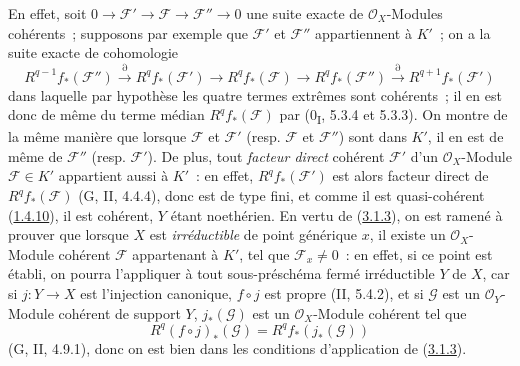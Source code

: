 En effet, soit
$0\to\mathcal F'\to\mathcal F\to\mathcal F''\to0$ une suite exacte de
$\mathcal O_X$-Modules cohérents~; supposons par exemple que $\mathcal F'$
et $\mathcal F''$ appartiennent à $K'$~; on a la suite exacte de cohomologie
\[
R^{q-1}f_*(\mathcal F'')\xrightarrow{\partial}R^qf_*(\mathcal F')
\longrightarrow R^qf_*(\mathcal F)\longrightarrow R^qf_*(\mathcal F'')
\xrightarrow{\partial}R^{q+1}f_*(\mathcal F')
\]
dans laquelle par hypothèse les quatre termes extrêmes sont cohérents~; il
en est donc de même du terme médian $R^qf_*(\mathcal F)$ par
(0\textsubscript{I}, 5.3.4 et 5.3.3). On montre de la même manière que
lorsque $\mathcal F$ et $\mathcal F'$ (resp. $\mathcal F$ et
$\mathcal F''$) sont dans $K'$, il en est de même de $\mathcal F''$ (resp.
$\mathcal F'$). De plus, tout \emph{facteur direct} cohérent $\mathcal F'$
d'un $\mathcal O_X$-Module $\mathcal F\in K'$ appartient aussi à $K'$~: en
effet, $R^qf_*(\mathcal F')$ est alors facteur direct de
$R^qf_*(\mathcal F)$ (G, II, 4.4.4), donc est de type fini, et comme il est
quasi-cohérent (\hyperref[III.1.4.10-fr]{1.4.10}), il est cohérent, $Y$
étant noethérien. En vertu de (\hyperref[III.3.1.3-fr]{3.1.3}), on est
ramené à prouver que lorsque $X$ est \emph{irréductible} de point générique
$x$, il existe un $\mathcal O_X$-Module cohérent $\mathcal F$ appartenant à
$K'$, tel que $\mathcal F_x\neq0$~: en effet, si ce point est établi, on
pourra l'appliquer à tout sous-préschéma fermé irréductible $Y$ de $X$, car
si $j:Y\to X$ est l'injection canonique, $f\circ j$ est propre (II, 5.4.2),
et si $\mathcal G$ est un $\mathcal O_Y$-Module cohérent de support $Y$,
$j_*(\mathcal G)$ est un $\mathcal O_X$-Module cohérent tel que
\[
R^q(f\circ j)_*(\mathcal G)=R^qf_*(j_*(\mathcal G))
\]
(G, II, 4.9.1), donc on est bien dans les conditions d'application de
(\hyperref[III.3.1.3-fr]{3.1.3}).

